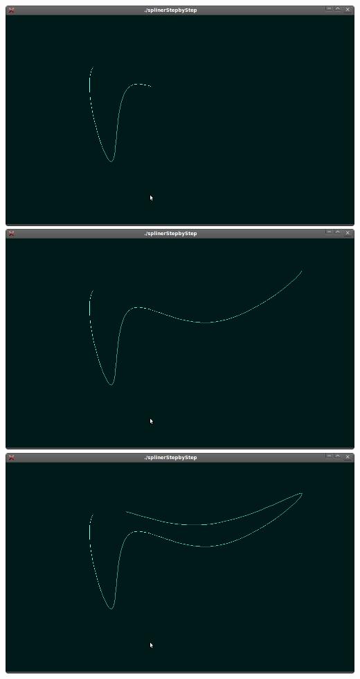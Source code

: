 \documentclass[]{article}
\begin{document}
   \centering
   \includegraphics[width=\mySize in]{11.png} \\
   \centering
   \includegraphics[width=\mySize in]{12.png} \\
   \includegraphics[width=\mySize in]{13.png} \\
\end{document}
